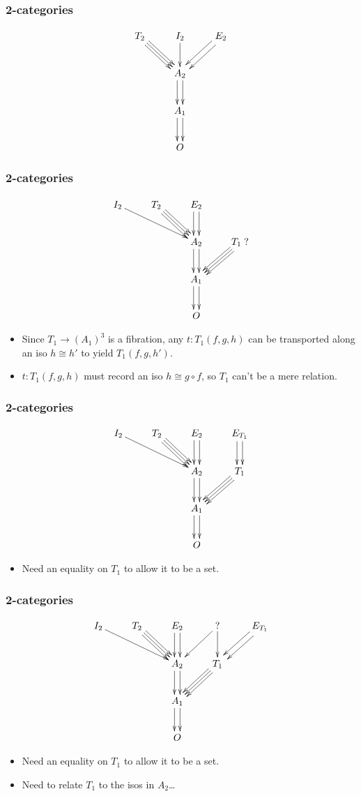 \documentclass{beamer}
\begin{document}
\begin{frame}[t]
  \frametitle{2-categories}
  \[
  \vcenter{\xymatrix{
      T_2 \ar[dr] \ar@<1mm>[dr] \ar@<-1mm>[dr] & I_2 \ar[d] & E_2 \ar@<1mm>[dl] \ar@<-1mm>[dl] \\
      & A_2 \ar@<1mm>[d] \ar@<-1mm>[d] \\
      & A_1 \ar@<1mm>[d] \ar@<-1mm>[d] \\
      & O}}
  \]
\end{frame}

\begin{frame}[t]
  \frametitle{2-categories}
  \[
  \vcenter{\xymatrix{
      I_2 \ar[drr] & T_2 \ar[dr] \ar@<1mm>[dr] \ar@<-1mm>[dr] & E_2 \ar@<1mm>[d] \ar@<-1mm>[d] \\
      && A_2 \ar@<1mm>[d] \ar@<-1mm>[d] & T_1 \; ? \ar[dl] \ar@<1mm>[dl] \ar@<-1mm>[dl]  \\
      && A_1 \ar@<1mm>[d] \ar@<-1mm>[d] \\
      && O}}
  \]
  \begin{itemize}
  \item Since $T_1 \to (A_1)^3$ is a fibration, any $t:T_1(f,g,h)$ can be transported along an iso $h \cong h'$ to yield $T_1(f,g,h')$.
  \item $t:T_1(f,g,h)$ must record an iso $h \cong g \circ f$, so $T_1$ can't be a mere relation.
  \end{itemize}
\end{frame}

\begin{frame}[t]
  \frametitle{2-categories}
  \[
  \vcenter{\xymatrix{
      I_2 \ar[drr] & T_2 \ar[dr] \ar@<1mm>[dr] \ar@<-1mm>[dr] & E_2 \ar@<1mm>[d] \ar@<-1mm>[d]
      & E_{T_1} \ar@<1mm>[d] \ar@<-1mm>[d]\\
      && A_2 \ar@<1mm>[d] \ar@<-1mm>[d] & T_1  \ar[dl] \ar@<1mm>[dl] \ar@<-1mm>[dl]  \\
      && A_1 \ar@<1mm>[d] \ar@<-1mm>[d] \\
      && O}}
  \]
  \begin{itemize}
  \item Need an equality on $T_1$ to allow it to be a set.
  \end{itemize}
\end{frame}

\begin{frame}[t]
  \frametitle{2-categories}
  \[
  \vcenter{\xymatrix{
      I_2 \ar[drr] & T_2 \ar[dr] \ar@<1mm>[dr] \ar@<-1mm>[dr] & E_2 \ar@<1mm>[d] \ar@<-1mm>[d]
      & ? \ar[dl] \ar[d]
      & E_{T_1} \ar@<1mm>[dl] \ar@<-1mm>[dl]\\
      && A_2 \ar@<1mm>[d] \ar@<-1mm>[d] & T_1  \ar[dl] \ar@<1mm>[dl] \ar@<-1mm>[dl]  \\
      && A_1 \ar@<1mm>[d] \ar@<-1mm>[d] \\
      && O}}
  \]
  \begin{itemize}
  \item Need an equality on $T_1$ to allow it to be a set.
  \item Need to relate $T_1$ to the isos in $A_2$\dots
  \end{itemize}
\end{frame}
\end{document}
